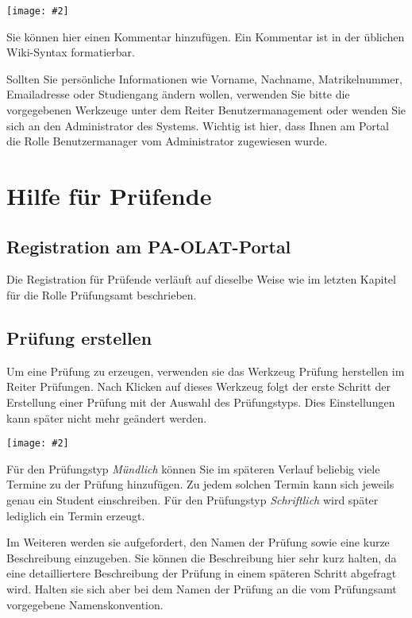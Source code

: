 \documentclass[a4paper,11pt]{article}
\newcommand{\bild}[2]{
    \begin{center}\texttt{[image: \#2]}\end{center}
}
\newcommand{\knopf}[1]{{\sc #1}}
\begin{document}
\bild{.9}{ESA-Edit}

Sie können hier einen \knopf{Kommentar hinzufügen}. Ein Kommentar ist in der
üblichen Wiki-Syntax formatierbar.

Sollten Sie persönliche Informationen wie Vorname, Nachname,
Matrikelnummer, Emailadresse oder Studiengang ändern wollen, verwenden Sie
bitte die vorgegebenen Werkzeuge unter dem Reiter \knopf{Benutzermanagement}
oder wenden Sie sich an den Administrator des Systems. Wichtig ist hier, dass
Ihnen am Portal die Rolle Benutzermanager vom Administrator zugewiesen wurde.

\clearpage
\section{Hilfe für Prüfende}

\subsection{Registration am PA-OLAT-Portal}

Die Registration für Prüfende verläuft auf dieselbe Weise wie im letzten
Kapitel für die Rolle Prüfungsamt beschrieben.

\subsection{Prüfung erstellen}

Um eine Prüfung zu erzeugen, verwenden sie das Werkzeug \knopf{Prüfung
  herstellen} im Reiter \knopf{Prüfungen}. Nach Klicken auf dieses Werkzeug
folgt der erste Schritt der Erstellung einer Prüfung mit der Auswahl des
Prüfungstyps. Dies Einstellungen kann später nicht mehr geändert werden.

\bild{.9}{Pruefung-Erzeugen-Typ}

Für den Prüfungstyp {\em Mündlich} können Sie im späteren Verlauf beliebig
viele Termine zu der Prüfung hinzufügen. Zu jedem solchen Termin kann sich
jeweils genau ein Student einschreiben.  Für den Prüfungstyp {\em Schriftlich}
wird später lediglich ein Termin erzeugt.

Im Weiteren werden sie aufgefordert, den Namen der Prüfung sowie eine kurze
Beschreibung einzugeben. Sie können die Beschreibung hier sehr kurz halten, da
eine detailliertere Beschreibung der Prüfung in einem späteren Schritt
abgefragt wird. Halten sie sich aber bei dem Namen der Prüfung an die vom
Prüfungsamt vorgegebene Namenskonvention. 
\end{document}
